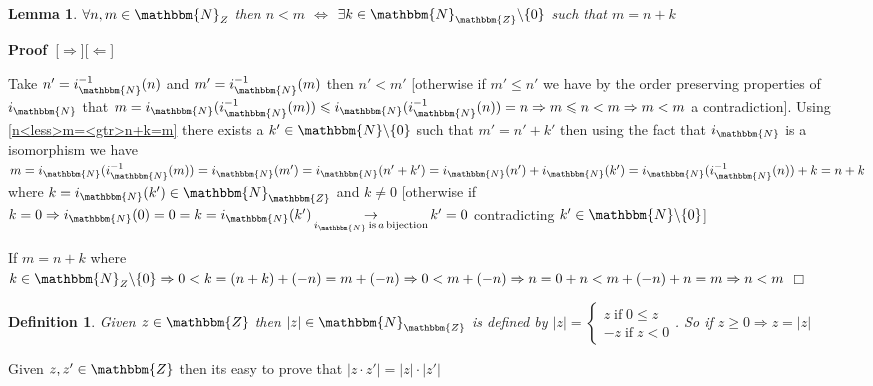 \documentclass{book}
\newcommand{\Rightarrowlim}{\mathop{\rightarrow}\limits}
\newcommand{\tmop}[1]{\ensuremath{\operatorname{#1}}}
\newcommand{\upl}{+}
\newenvironment{proof}{\noindent\textbf{Proof\ }}{\hspace*{\fill}$\Box$\medskip}
\newtheorem{definition}{Definition}
{\theorembodyfont{\rmfamily}\newtheorem{example}{Example}}
\newtheorem{lemma}{Lemma}
\begin{document}
{{\begin{lemma}
  \label{n<less>m=m=n+k,k<less><gtr>0 in N embedded in integers}$\forall n, m
  \in \mathbbm{N}_Z$ then $n < m$ $\Leftrightarrow$ $\exists k \in
  \mathbbm{N}_{\mathbbm{Z}} \backslash \{ 0 \}$ such that $m = n \upl k$
\end{lemma}

\begin{proof}[$\Rightarrow$][$\Leftarrow$]
  \
  
  Take $n' = i_{\mathbbm{N}}^{- 1} (n)$ and $m' = i_{\mathbbm{N}}^{- 1} (m)$
  then $n' < m'$ [otherwise if $m' \leqslant n'$ we have by the order
  preserving properties of $i_{\mathbbm{N}}$ that $m = i_{\mathbbm{N}}
  (i_{\mathbbm{N}}^{- 1} (m)) \leqslant i_{\mathbbm{N}} (i_{\mathbbm{N}}^{- 1}
  (n)) = n \Rightarrow m \leqslant n < m \Rightarrow m < m$ a contradiction].
  Using \ref{n<less>m=<gtr>n+k=m} there exists a $k' \in \mathbbm{N}
  \backslash \{ 0 \}$ such that $m' = n' \upl k'$ then using the fact that
  $i_{\mathbbm{N}}$ is a isomorphism we have $m = i_{\mathbbm{N}}
  (i_{\mathbbm{N}}^{- 1} (m)) = i_{\mathbbm{N}} (m') = i_{\mathbbm{N}} (n'
  \upl k') = i_{\mathbbm{N}} (n') \upl i_{\mathbbm{N}} (k') = i_{\mathbbm{N}}
  (i_{\mathbbm{N}}^{- 1} (n)) \upl k = n \upl k$ where $k = i_{\mathbbm{N}}
  (k') \in \mathbbm{N}_{\mathbbm{Z}}$ and $k \neq 0$ [otherwise if $k = 0
  \Rightarrow i_{\mathbbm{N}} (0) = 0 = k = i_{\mathbbm{N}} (k')
  \Rightarrowlim_{i_{\mathbbm{N}} \tmop{is} a \tmop{bijection}} k' = 0$
  contradicting $k' \in \mathbbm{N} \backslash \{ 0 \}$]
  
  If $m = n \upl k$ where $k \in \mathbbm{N}_Z \backslash \{ 0 \} \Rightarrow
  0 < k = (n \upl k) \upl (- n) = m \upl (- n) \Rightarrow 0 < m \upl (- n)
  \Rightarrow n = 0 \upl n < m \upl (- n) \upl n = m \Rightarrow n < m$
\end{proof}

\begin{definition}
  \label{absolute value of integers}{}{\index{$|
  |$}}Given $z \in \mathbbm{Z}$ then $| z | \in \mathbbm{N}_{\mathbbm{Z}}$ is
  defined by $| z | = \left\{ \begin{array}{l}
    z \tmop{if} 0 \leqslant z\\
    - z \tmop{if} z < 0
  \end{array} \right.$. So if $z \geqslant 0 \Rightarrow z = | z |$
\end{definition}

\begin{note}
  Given $z, z' \in \mathbbm{Z}$ then its easy to prove that $| z \cdot z' | =
  | z | \cdot | z' |$
\end{note}

}}
\end{document}
